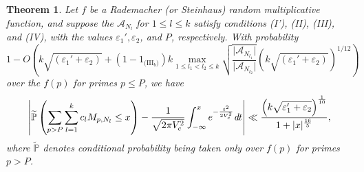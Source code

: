 \documentclass[11pt]{tran-l}
\newtheorem{theorem}{Theorem}[section]
\theoremstyle{definition}
\theoremstyle{remark}
\numberwithin{equation}{section}
\begin{document}
\begin{theorem}\label{thm: complicatedapproxJointG}
    Let $f$ be a Rademacher (or Steinhaus) random multiplicative function, and suppose the $\mathcal A_{N_l}$ for $1\leq l\leq k$ satisfy conditions (I'), (II), (III), and (IV), with the values $\varepsilon_1', \varepsilon_2$, and $P$, respectively. With probability \begin{equation}\label{eq:bigProb}1 - O\left(k\sqrt{(\varepsilon_1' + \varepsilon_2)} +(1-1_{\text{(III$_b$)}}) k \max_{1\leq l_1<l_2\leq k} \sqrt{\frac{\lvert \mathcal A_{N_{l_1}}\rvert}{\lvert \mathcal A_{N_{l_2}}\rvert}}\left(k\sqrt{(\varepsilon_1' + \varepsilon_2)}\right)^{1/12}\right)\end{equation} over the $f(p)$ for primes $p\leq P$, we have 
    \begin{equation*}\left\lvert\widetilde{\mathbb P}\left(\sum_{p>P}\sum_{l=1}^k c_l M_{p, N_l}\leq x \right) - \frac{1}{\sqrt{2\pi V_c^2}}\int_{-\infty}^x e^{-\frac{t^2}{2V_c^2}}\emph{d}t\right \rvert  \ll \frac{\left(k\sqrt{\varepsilon_1' + \varepsilon_2}\right)^{\frac{1}{10}}}{1+\lvert x\rvert^{\frac{16}{5}}}, \end{equation*} where $\widetilde{\mathbb P}$ denotes conditional probability being taken only over $f(p)$ for primes $p>P$. 
\end{theorem}
\end{document}

